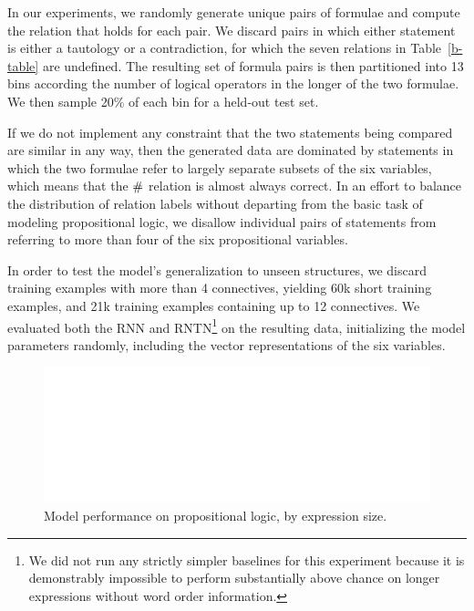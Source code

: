 In our experiments, we randomly generate unique pairs 
of formulae and compute the relation that holds for each pair.
We discard pairs in which either statement is either a tautology or a
contradiction, for which the seven relations in
Table~\ref{b-table} are undefined. The resulting set of formula pairs is
then partitioned into 13 bins according the number of logical operators in
the longer of the two formulae. We then sample 20\% of each
bin for a held-out test set.

If we do not implement any constraint that the two statements being
compared are similar in any way, then the generated data are dominated
by statements in which the two formulae refer to largely separate
subsets of the six variables, which means that the $\mathbin{\#}$ relation
is almost always correct.  In an effort to balance the distribution of
relation labels without departing from the basic task of modeling
propositional logic, we disallow individual pairs of statements from
referring to more than four of the six propositional variables.

In order to test the model's generalization to unseen structures, we discard
training examples with more than 4 connectives, yielding 60k short training examples,
and 21k training examples containing up to 12 connectives.
We evaluated both the RNN and RNTN\footnote{We did not run any strictly simpler baselines for this experiment because it is demonstrably impossible to perform substantially above chance on longer expressions without word order information.} on the resulting data, initializing the model parameters randomly,
including the vector representations of the six variables.


\begin{figure}[t]
  \centering
  \includegraphics[width=5.75in]{decayfig.eps}
  \caption{Model performance on propositional logic, by expression size.}
    
  \label{prop-results} 
  
\end{figure}


